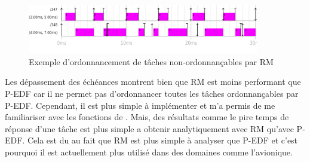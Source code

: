 \begin{figure}[H]
    \centering
    \includegraphics[width=0.9\textwidth]{Images/RM_rMerde.png}
    \caption{Exemple d'ordonnancement de tâches non-ordonnançables par RM}
\end{figure}

Les dépassement des échéances montrent bien que RM est moins performant que P-EDF car il ne permet pas d'ordonnancer toutes les tâches ordonnançables par P-EDF. Cependant, il est plus simple à implémenter et m'a permis de me familiariser avec les fonctions de \litmus. Mais, des résultats comme le pire temps de réponse d'une tâche est plus simple a obtenir analytiquement avec RM qu'avec P-EDF. Cela est du au fait que RM est plus simple à analyser que P-EDF et c'est pourquoi il est actuellement plus utilisé dans des domaines comme l'avionique.
